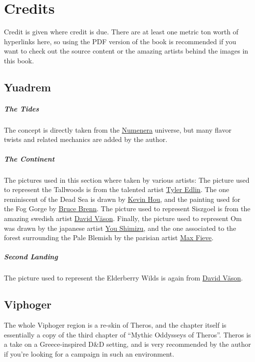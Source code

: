 \section{Credits}

Credit is given where credit is due.
There are at least one metric ton worth of hyperlinks here, so using the PDF version of the book is recommended if you want to check out the source content or the amazing artists behind the images in this book.

\subsection*{Yuadrem}
    \subparagraph{The Tides} The concept is directly taken from the \href{http://numenera.com/}{Numenera} universe, but many flavor twists and related mechanics are added by the author.

    \subparagraph{The Continent} The pictures used in this section where taken by various artists:
    The picture used to represent the Tallwoods is from the talented artist \href{https://www.artstation.com/tyleredlinart}{Tyler Edlin}.
    The one reminiscent of the Dead Sea is drawn by \href{https://www.artstation.com/knightblur}{Kevin Hou}, and the painting used for the Fog Gorge by \href{https://www.artstation.com/brucebrenn}{Bruce Brenn}.
    The picture used to represent Siszgoel is from the amazing swedish artist \href{https://www.artstation.com/davidvason}{David V\"ason}.
    Finally, the picture used to represent Om was drawn by the japanese artist \href{https://www.pixiv.net/en/users/2830609}{You Shimizu}, and the one associated to the forest surrounding the Pale Blemish by the parisian artist \href{https://www.artstation.com/maxfieve}{Max Fieve}.

    \subparagraph{Second Landing} The picture used to represent the Elderberry Wilds is again from \href{https://www.artstation.com/davidvason}{David V\"ason}.

\subsection*{Viphoger}
    The whole Viphoger region is a re-skin of Theros, and the chapter itself is essentially a copy of the third chapter of ``Mythic Oddysseys of Theros''.
    Theros is a take on a Greece-inspired D\&D setting, and is very recommended by the author if you're looking for a campaign in such an environment.


